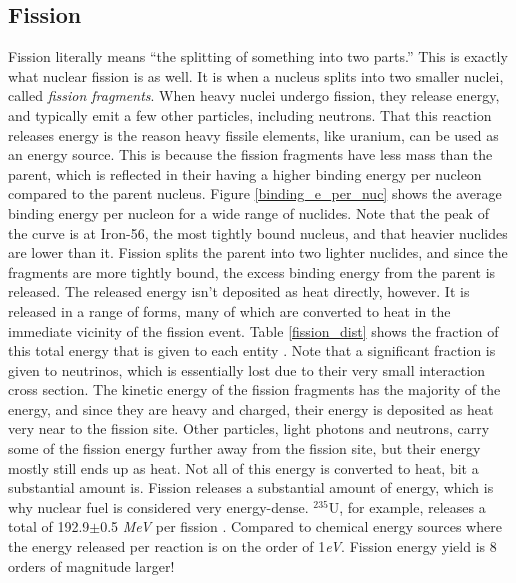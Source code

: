 \subsection{Fission}

Fission literally means ``the splitting of something into two parts.''  This is exactly what nuclear fission is as well.  It is when a nucleus splits into two smaller nuclei, called \emph{fission fragments}.  When heavy nuclei undergo fission, they release energy, and typically emit a few other particles, including neutrons.  That this reaction releases energy is the reason heavy fissile elements, like uranium, can be used as an energy source.  This is because the fission fragments have less mass than the parent, which is reflected in their having a higher binding energy per nucleon compared to the parent nucleus.  Figure \ref{binding_e_per_nuc} shows the average binding energy per nucleon for a wide range of nuclides.  Note that the peak of the curve is at Iron-56, the most tightly bound nucleus, and that heavier nuclides are lower than it.  Fission splits the parent into two lighter nuclides, and since the fragments are more tightly bound, the excess binding energy from the parent is released.  The released energy isn't deposited as heat directly, however.  It is released in a range of forms, many of which are converted to heat in the immediate vicinity of the fission event.   Table \ref{fission_dist} shows the fraction of this total energy that is given to each entity \cite{duderstadt}.  Note that a significant fraction is given to neutrinos, which is essentially lost due to their very small interaction cross section.  The kinetic energy of the fission fragments has the majority of the energy, and since they are heavy and charged, their energy is deposited as heat very near to the fission site.  Other particles, light photons and neutrons, carry some of the fission energy further away from the fission site, but their energy mostly still ends up as heat.  Not all of this energy is converted to heat, bit a substantial amount is.   Fission releases a substantial amount of energy, which is why nuclear fuel is considered very energy-dense.  $^{235}$U, for example, releases a total of 192.9$\pm$0.5 \emph{MeV} per fission \cite{duderstadt}.  Compared to chemical energy sources where the energy released per reaction is on the order of 1\emph{eV}.  Fission energy yield is 8 orders of magnitude larger!  
  
